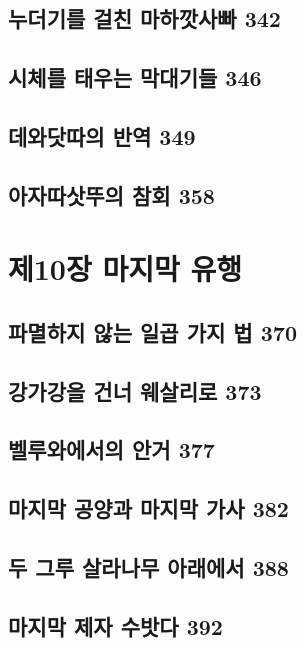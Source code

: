\documentclass[12pt, a4paper, oneside]{book}
\let\stdsection\section
\renewcommand\section{\newpage\stdsection}
\begin{document}
	\section{누더기를 걸친 마하깟사빠 342 }

	\section{시체를 태우는 막대기들 346 }

	\section{데와닷따의 반역 349 }

	\section{아자따삿뚜의 참회 358}


	\chapter{제10장 마지막 유행}
	\noptcrule
	\parttoc				


	\section{파멸하지 않는 일곱 가지 법 370 }

	\section{강가강을 건너 웨살리로 373 }

	\section{벨루와에서의 안거 377 }

	\section{마지막 공양과 마지막 가사 382 }

	\section{두 그루 살라나무 아래에서 388 }

	\section{마지막 제자 수밧다 392 }
\end{document}
